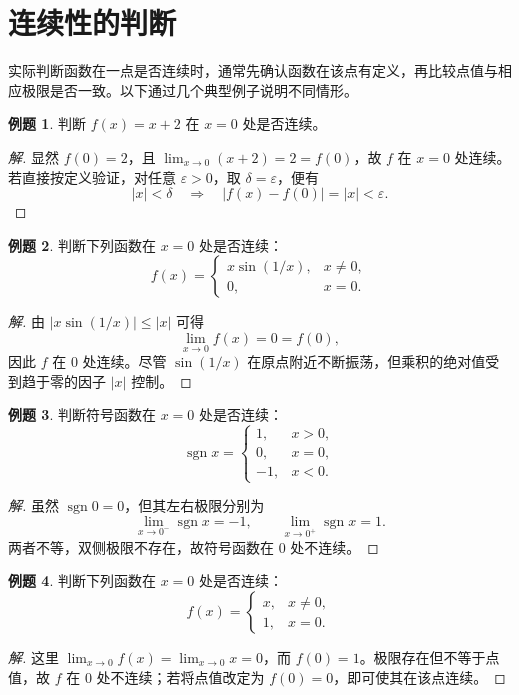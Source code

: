 \documentclass[UTF8,fontset=fandol,a4paper,12pt]{ctexart}
\theoremstyle{definition}
\newtheorem*{example}{例题}
\begin{document}
\section{连续性的判断}
实际判断函数在一点是否连续时，通常先确认函数在该点有定义，再比较点值与相应极限是否一致。以下通过几个典型例子说明不同情形。

\begin{example}
判断 $f(x)=x+2$ 在 $x=0$ 处是否连续。
\end{example}
\begin{proof}[解]
显然 $f(0)=2$，且 $\lim_{x\to0}(x+2)=2=f(0)$，故 $f$ 在 $x=0$ 处连续。若直接按定义验证，对任意 $\varepsilon>0$，取 $\delta=\varepsilon$，便有
\[
 |x|<\delta\quad\Longrightarrow\quad
 |f(x)-f(0)|=|x|<\varepsilon.
\]
\end{proof}

\begin{example}
判断下列函数在 $x=0$ 处是否连续：
\[
 f(x)=\begin{cases}x\sin(1/x),&x\ne0,\\0,&x=0.\end{cases}
\]
\end{example}
\begin{proof}[解]
由 $|x\sin(1/x)|\le|x|$ 可得
\[
 \lim_{x\to0}f(x)=0=f(0),
\]
因此 $f$ 在 $0$ 处连续。尽管 $\sin(1/x)$ 在原点附近不断振荡，但乘积的绝对值受到趋于零的因子 $|x|$ 控制。
\end{proof}

\begin{example}
判断符号函数在 $x=0$ 处是否连续：
\[
 \operatorname{sgn}x=
 \begin{cases}1,&x>0,\\0,&x=0,\\-1,&x<0.\end{cases}
\]
\end{example}
\begin{proof}[解]
虽然 $\operatorname{sgn}0=0$，但其左右极限分别为
\[
 \lim_{x\to0^-}\operatorname{sgn}x=-1,\qquad
 \lim_{x\to0^+}\operatorname{sgn}x=1.
\]
两者不等，双侧极限不存在，故符号函数在 $0$ 处不连续。
\end{proof}

\begin{example}
判断下列函数在 $x=0$ 处是否连续：
\[
 f(x)=\begin{cases}x,&x\ne0,\\1,&x=0.\end{cases}
\]
\end{example}
\begin{proof}[解]
这里 $\lim_{x\to0}f(x)=\lim_{x\to0}x=0$，而 $f(0)=1$。极限存在但不等于点值，故 $f$ 在 $0$ 处不连续；若将点值改定为 $f(0)=0$，即可使其在该点连续。
\end{proof}
\end{document}
